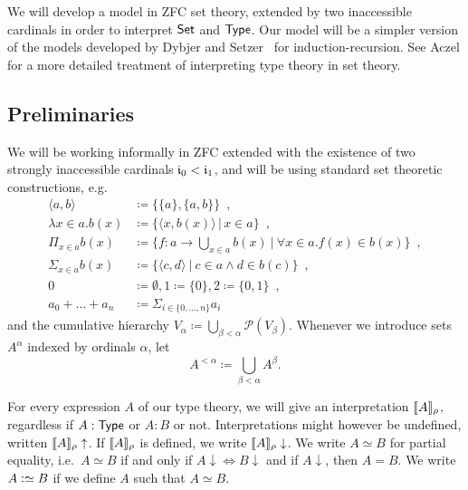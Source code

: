 \documentclass{article}
\begin{document}
We will develop a model in ZFC set theory, extended by two
inaccessible cardinals in order to interpret $\mathsf{Set}$ and $\mathsf{Type}$.  Our
model will be a simpler version of the models developed by Dybjer and
Setzer~\cite{dybjersetzer1999finax,dybjersetzer2006IIR} for
induction-recursion. %
See Aczel \cite{aczel1999typesandsets} for a more detailed treatment
of interpreting type theory in set theory.



\subsection{Preliminaries}

We will be working informally in ZFC extended with the existence of two
strongly inaccessible cardinals $\mathfrak{i}_0 < \mathfrak{i}_1$,
and will be using standard set theoretic constructions, e.g.
\begin{align*}
\langle a, b\rangle &\coloneqq \{ \{ a \}, \{ a, b \}\} \enspace , \\
\lambda x \in a.b(x) &\coloneqq \{\langle x, b(x)\rangle\,|\,x \in a \} \enspace ,\\
\Pi_{x \in a}b(x) &\coloneqq \{ f : a \to \bigcup_{x \in a}b(x)\ |\ \forall x \in a.f(x) \in b(x)\} \enspace , \\
\Sigma_{x \in a}b(x) &\coloneqq \{ \langle c , d\rangle\ |\ c \in a \land d
\in b(c) \} \enspace , \\
0 &\coloneqq \emptyset, 1 \coloneqq \{0\}, 2 \coloneqq \{0, 1\} \enspace , \\
a_0 + \ldots + a_n &\coloneqq \Sigma_{i \in \{0, \ldots, n\}}a_i
\end{align*}
and the cumulative hierarchy $V_{\alpha} \coloneqq
\displaystyle\bigcup_{\beta < \alpha} \mathcal{P}(V_{\beta})$. Whenever we
introduce sets $A^{\alpha}$ indexed by ordinals $\alpha$, let \[A^{< \alpha}
\coloneqq \displaystyle\bigcup_{\beta < \alpha}A^{\beta}.\]

For every expression $A$ of our type theory, we will give an interpretation
$\llbracket A \rrbracket_\rho$, regardless if $A : \mathsf{Type}$ or $A : B$ or not. Interpretations
might however be undefined, written $\llbracket A \rrbracket_\rho\uparrow$. If $\llbracket A \rrbracket_\rho$
is defined, we write $\llbracket A \rrbracket_\rho\downarrow$. We write $A \simeq B$ for
partial equality, i.e.\ $A \simeq B$ if and only if $A\downarrow
\Leftrightarrow B\downarrow$ and if $A\downarrow$, then $A = B$. We write $A
\mathrel{\mathop:}\simeq B$ if we define $A$ such that $A \simeq B$.
\end{document}
